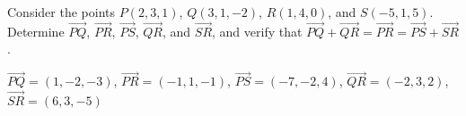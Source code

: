 
\begin{Exercise}[
name={},
title={}, 
difficulty=0,
origin={\cite{SM}}]
Consider the points $P(2,3,1)$, $Q(3,1,-2)$, $R(1,4,0)$, and $S(-5,1,5)$. Determine $\overrightarrow{PQ}$, $\overrightarrow{PR}$, $\overrightarrow{PS}$, $\overrightarrow{QR}$, and $\overrightarrow{SR}$, and verify that $\overrightarrow{PQ}+\overrightarrow{QR}=\overrightarrow{PR}=\overrightarrow{PS}+\overrightarrow{SR}$.
\end{Exercise}

\begin{Answer}
$\overrightarrow{PQ}=(1,-2,-3)$, $\overrightarrow{PR}=(-1,1,-1)$, $\overrightarrow{PS}=(-7,-2,4)$, $\overrightarrow{QR}=(-2,3,2)$, $\overrightarrow{SR}=(6,3,-5)$
\end{Answer}
